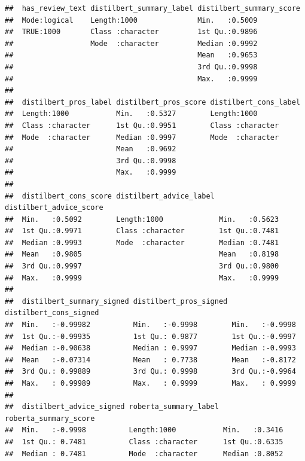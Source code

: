 \documentclass[
]{article}
\begin{document}
\begin{verbatim}
##  has_review_text distilbert_summary_label distilbert_summary_score
##  Mode:logical    Length:1000              Min.   :0.5009          
##  TRUE:1000       Class :character         1st Qu.:0.9896          
##                  Mode  :character         Median :0.9992          
##                                           Mean   :0.9653          
##                                           3rd Qu.:0.9998          
##                                           Max.   :0.9999          
##                                                                   
##  distilbert_pros_label distilbert_pros_score distilbert_cons_label
##  Length:1000           Min.   :0.5327        Length:1000          
##  Class :character      1st Qu.:0.9951        Class :character     
##  Mode  :character      Median :0.9997        Mode  :character     
##                        Mean   :0.9692                             
##                        3rd Qu.:0.9998                             
##                        Max.   :0.9999                             
##                                                                   
##  distilbert_cons_score distilbert_advice_label distilbert_advice_score
##  Min.   :0.5092        Length:1000             Min.   :0.5623         
##  1st Qu.:0.9971        Class :character        1st Qu.:0.7481         
##  Median :0.9993        Mode  :character        Median :0.7481         
##  Mean   :0.9805                                Mean   :0.8198         
##  3rd Qu.:0.9997                                3rd Qu.:0.9800         
##  Max.   :0.9999                                Max.   :0.9999         
##                                                                       
##  distilbert_summary_signed distilbert_pros_signed distilbert_cons_signed
##  Min.   :-0.99982          Min.   :-0.9998        Min.   :-0.9998       
##  1st Qu.:-0.99935          1st Qu.: 0.9877        1st Qu.:-0.9997       
##  Median :-0.90638          Median : 0.9997        Median :-0.9993       
##  Mean   :-0.07314          Mean   : 0.7738        Mean   :-0.8172       
##  3rd Qu.: 0.99889          3rd Qu.: 0.9998        3rd Qu.:-0.9964       
##  Max.   : 0.99989          Max.   : 0.9999        Max.   : 0.9999       
##                                                                         
##  distilbert_advice_signed roberta_summary_label roberta_summary_score
##  Min.   :-0.9998          Length:1000           Min.   :0.3416       
##  1st Qu.: 0.7481          Class :character      1st Qu.:0.6335       
##  Median : 0.7481          Mode  :character      Median :0.8052       

\end{verbatim}
\end{document}
